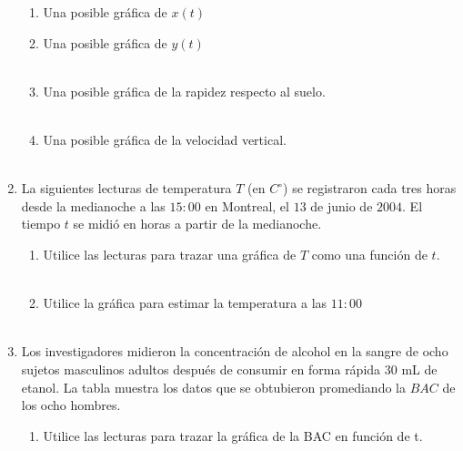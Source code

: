 \begin{enumerate}
\begin{enumerate}[\bfseries (a)]
		\item Una posible gráfica de $x(t)$\\

		\item Una posible gráfica de $y(t)$\\\\

		\item Una posible gráfica de la rapidez respecto al suelo.\\\\

		\item Una posible gráfica de la velocidad vertical.\\\\

	    \end{enumerate}

	\item La siguientes lecturas de temperatura $T$ (en $C^{\circ}$) se registraron cada tres horas desde la medianoche a las $15:00$ en Montreal, el $13$ de junio de $2004$. El tiempo $t$ se midió en horas a partir de la medianoche.

	    \begin{enumerate}[\bfseries (a)]

		\item Utilice las lecturas para trazar una gráfica de $T$ como una función de $t$.\\\\

		\item Utilice la gráfica para estimar la temperatura a las $11:00$\\\\

	    \end{enumerate}

    \item Los investigadores midieron la concentración de alcohol en la sangre de ocho sujetos masculinos adultos después de consumir en forma rápida $30$ mL de etanol. La tabla muestra los datos que se obtubieron promediando la $BAC$ de los ocho hombres.

	\begin{enumerate}[\bfseries (a)]

	    \item Utilice las lecturas para trazar la gráfica de la BAC en función de t.\\\\


\end{enumerate}
\end{enumerate}

